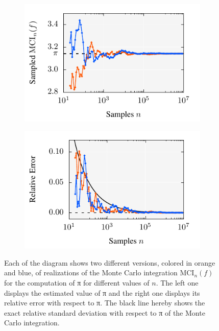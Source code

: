 \documentclass{stdlocal}
\begin{document}
    \begin{figure}
      \center
      \begin{subfigure}[b]{0.49\linewidth}
        \center
        \includegraphics[width=\linewidth]{../../../examples/monte_carlo_pi_plot.pdf}
      \end{subfigure}
      \begin{subfigure}[b]{0.49\linewidth}
        \center
        \includegraphics[width=\linewidth]{../../../examples/monte_carlo_pi_plot_error.pdf}
      \end{subfigure}
      \caption[Monte Carlo Integration Plots for the Computation of π]{%
        Each of the diagram shows two different versions, colored in orange and blue, of realizations of the Monte Carlo integration $\mathrm{MCI}_n(f)$ for the computation of π for different values of $n$.
        The left one displays the estimated value of π and the right one displays its relative error with respect to π.
        The black line hereby shows the exact relative standard deviation with respect to π of the Monte Carlo integration.
      }
      \label{fig:pi-computation-plots}
    \end{figure}
\end{document}
